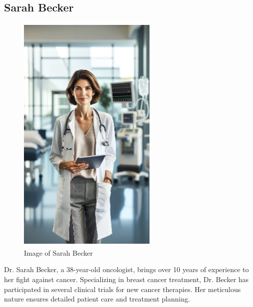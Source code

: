 \subsection{Sarah Becker}
\begin{figure}
  \centering
  \vspace{-1.4em}
  \includegraphics[width=0.9\linewidth]{./images/sarah.png}
  \caption[Image of Sarah Becker, generated by gpt-4-turbo]{Image of Sarah Becker}
\end{figure}\leavevmode
Dr. Sarah Becker, a 38-year-old oncologist, brings over 10 years of experience to her fight against cancer. Specializing in breast cancer treatment, Dr. Becker has participated in several clinical trials for new cancer therapies. Her meticulous nature ensures detailed patient care and treatment planning.
